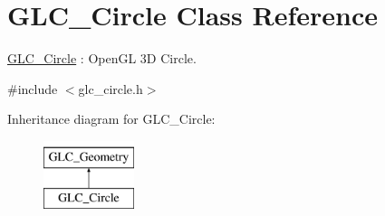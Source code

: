 \hypertarget{class_g_l_c___circle}{\section{G\-L\-C\-\_\-\-Circle Class Reference}
\label{class_g_l_c___circle}
}


\hyperlink{class_g_l_c___circle}{G\-L\-C\-\_\-\-Circle} \-: Open\-G\-L 3\-D Circle.  




{\ttfamily \#include $<$glc\-\_\-circle.\-h$>$}

Inheritance diagram for G\-L\-C\-\_\-\-Circle\-:\begin{figure}[H]
\begin{center}
\leavevmode
\includegraphics[height=2.000000cm]{class_g_l_c___circle}
\end{center}
\end{figure}
